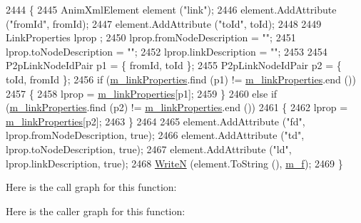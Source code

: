 \begin{DoxyCode}
2444 \{
2445   AnimXmlElement element (\textcolor{stringliteral}{"link"});
2446   element.AddAttribute (\textcolor{stringliteral}{"fromId"}, fromId);
2447   element.AddAttribute (\textcolor{stringliteral}{"toId"}, toId);
2448 
2449   LinkProperties lprop ;
2450   lprop.fromNodeDescription = \textcolor{stringliteral}{""};
2451   lprop.toNodeDescription = \textcolor{stringliteral}{""};
2452   lprop.linkDescription = \textcolor{stringliteral}{""};
2453 
2454   P2pLinkNodeIdPair p1 = \{ fromId, toId \};
2455   P2pLinkNodeIdPair p2 = \{ toId, fromId \};
2456   \textcolor{keywordflow}{if} (\hyperlink{classns3_1_1AnimationInterface_a8f40a5be6a97ed9f1e2692a604b27d15}{m\_linkProperties}.find (p1) != \hyperlink{classns3_1_1AnimationInterface_a8f40a5be6a97ed9f1e2692a604b27d15}{m\_linkProperties}.end ())
2457     \{
2458       lprop = \hyperlink{classns3_1_1AnimationInterface_a8f40a5be6a97ed9f1e2692a604b27d15}{m\_linkProperties}[p1];
2459     \}
2460   \textcolor{keywordflow}{else} \textcolor{keywordflow}{if} (\hyperlink{classns3_1_1AnimationInterface_a8f40a5be6a97ed9f1e2692a604b27d15}{m\_linkProperties}.find (p2) != \hyperlink{classns3_1_1AnimationInterface_a8f40a5be6a97ed9f1e2692a604b27d15}{m\_linkProperties}.end ())
2461     \{
2462       lprop = \hyperlink{classns3_1_1AnimationInterface_a8f40a5be6a97ed9f1e2692a604b27d15}{m\_linkProperties}[p2];
2463     \}
2464   
2465   element.AddAttribute (\textcolor{stringliteral}{"fd"}, lprop.fromNodeDescription, \textcolor{keyword}{true}); 
2466   element.AddAttribute (\textcolor{stringliteral}{"td"}, lprop.toNodeDescription, \textcolor{keyword}{true}); 
2467   element.AddAttribute (\textcolor{stringliteral}{"ld"}, lprop.linkDescription, \textcolor{keyword}{true}); 
2468   \hyperlink{classns3_1_1AnimationInterface_a4cdd131c35733674773098d094f30066}{WriteN} (element.ToString (), \hyperlink{classns3_1_1AnimationInterface_a0185faff439edec3095ab22d1ada8aa5}{m\_f});
2469 \}
\end{DoxyCode}


Here is the call graph for this function\+:




Here is the caller graph for this function\+:


